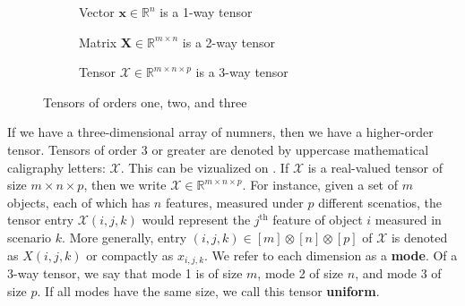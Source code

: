     \begin{figure}[ht]
        \def\distance{0.2}
        \def\one{0.3}
        \def\n{2}
        \def\m{2.5}
        \def\p{1.5}
        \def\rot{90}

        \centering
        
        \begin{subfigure}[b]{0.26\textwidth}
            \centering
            
            \caption[a Vector]{Vector $\mathbf{x}\in \mathbb{R}^n$ is a 1-way tensor}
            \label{fig:vector}
        \end{subfigure}
        \hfill
        \begin{subfigure}[b]{0.3\textwidth}
            \centering
            
            \caption[a Matrix]{Matrix $\mathbf{X} \in \mathbb{R}^{m\times n}$ is a 2-way tensor}
            \label{fig:matrix}
        \end{subfigure}
        \hfill
        \begin{subfigure}[b]{0.31\textwidth}
            \centering
            
            \caption[a 3D Tensor]{Tensor $\mathcal{X}\in \mathbb{R}^{m\times n \times p}$ is a 3-way tensor}
            \label{fig:tensor3}
        \end{subfigure}

        \caption{Tensors of orders one, two, and three}
        \label{fig:Tensors123}
    \end{figure}

    If we have a three-dimensional array of numners, then we have a higher-order
    tensor. Tensors of order 3 or greater are denoted by uppercase mathematical
    caligraphy letters: $\mathcal{X}$. This can be vizualized on
    . If $\mathcal{X}$ is a real-valued tensor of size
    $m\times n \times p$, then we write $\mathcal{X}\in \mathbb{R}^{m\times
    n\times p}$. For instance, given a set of $m$ objects, each of which has $n$
    features, measured under $p$ different scenatios, the tensor entry
    $\mathcal{X}(i, j, k)$ would represent the $j^\text{th}$ feature of object
    $i$ measured in scenario $k$. More generally, entry $(i, j, k) \in
    [m]\otimes [n]\otimes [p]$ of $\mathcal{X}$ is denoted as $X(i, j, k)$ or
    compactly as $x_{i, j, k}$. We refer to each dimension as a \textbf{mode}.
    Of a 3-way tensor, we say that mode 1 is of size $m$, mode 2 of size $n$,
    and mode 3 of size $p$. If all modes have the same size, we call this tensor
    \textbf{uniform}.

